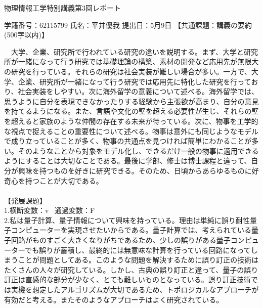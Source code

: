 \documentclass[a4paper,10.5pt]{ltjsarticle}
\begin{document}
\centerline
{\huge 物理情報工学特別講義第3回レポート}
\rightline
{学籍番号：62115799}
\rightline
{氏名：平井優我}
\rightline
{提出日：5月9日}
\rightline
{}
\leftline
{\large 【共通課題：講義の要約(500字以内)】}

　大学、企業、研究所で行われている研究の違いを説明する。まず、大学と研究
所が一緒になって行う研究では基礎理論の構築、素材の開発など応用先が無限大の研究を行っている。それらの研究は社会実装が難しい場合が多い。一方で、大学、企業、研究所が一緒になって行う研究では応用先に特化した研究を行っており、社会実装をしやすい。次に海外留学の意義について述べる。海外留学では、思うように自分を表現できなかったりする経験から主張欲が高まり、自分の意見を持てるようになる。また、言語や文化の壁を超える必要性が生じ、それらの壁を超えると家族のような仲間の存在する未来が待っている。次に、物事を工学的な視点で捉えることの重要性について述べる。物事は意外にも同じようなモデルで成り立っていることが多く、物事の共通点を見つければ簡単にわかることが多い。そのようなことから対象をモデル化し、できるだけ一般の物事に適用できるようにすることは大切なことである。最後に学部、修士は博士課程と違って、自分が興味を持つものを好きに研究できる。そのため、日頃からあらゆるものに好奇心を持つことが大切である。\\
\\
\leftline
{\large 【発展課題】}\\
1.横断変数：v \  通過変数：F\\
2.私は量子計算、量子情報について興味を持っている。理由は単純に誤り耐性量子コンピューターを実現させたいからである。量子計算では、考えられている量子回路がものすごく大きくなりがちであるため、少しの誤りがある量子コンピューターでも誤りが蓄積し、最終的には無意味な計算を行っている回路になってしまうことが問題としてある。このような問題を解決するために誤り訂正の技術はたくさんの人々が研究している。しかし、古典の誤り訂正と違って、量子の誤り訂正は直感的な部分が少なく、とても難しいものとなっている。誤り訂正技術では実機を想定したアルゴリズムが大切であるため、トポロジカルなアプローチが有効だと考える。またそのようなアプローチはよく研究されている。
\end{document}
